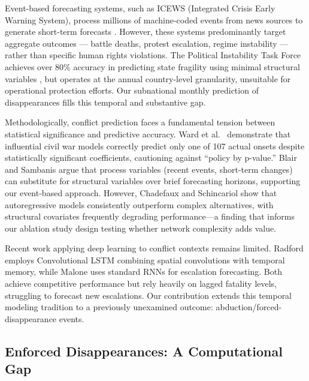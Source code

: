 \documentclass[pdflatex,sn-mathphys-num]{sn-jnl}%
\theoremstyle{thmstyleone}%
\theoremstyle{thmstyletwo}%
\theoremstyle{thmstylethree}%
\begin{document}
Event-based forecasting systems, such as ICEWS (Integrated Crisis Early Warning System), process millions of machine-coded events from news sources to generate short-term forecasts \cite{obrien2010crisis}. However, these systems predominantly target aggregate outcomes — battle deaths, protest escalation, regime instability — rather than specific human rights violations. The Political Instability Task Force achieves over 80\% accuracy in predicting state fragility using minimal structural variables \cite{goldstone2010global}, but operates at the annual country-level granularity, unsuitable for operational protection efforts. Our subnational monthly prediction of disappearances fills this temporal and substantive gap.

Methodologically, conflict prediction faces a fundamental tension between statistical significance and predictive accuracy. Ward et al.~\cite{ward2010perils} demonstrate that influential civil war models correctly predict only one of 107 actual onsets despite statistically significant coefficients, cautioning against ``policy by p-value.'' Blair and Sambanis \cite{blair2020forecasting} argue that process variables (recent events, short-term changes) can substitute for structural variables over brief forecasting horizons, supporting our event-based approach. However, Chadefaux and Schincariol \cite{chadefaux2025endogenous} show that autoregressive models consistently outperform complex alternatives, with structural covariates frequently degrading performance---a finding that informs our ablation study design testing whether network complexity adds value.

Recent work applying deep learning to conflict contexts remains limited. Radford \cite{radford2022high} employs Convolutional LSTM combining spatial convolutions with temporal memory, while Malone \cite{malone2022recurrent} uses standard RNNs for escalation forecasting. Both achieve competitive performance but rely heavily on lagged fatality levels, struggling to forecast new escalations. Our contribution extends this temporal modeling tradition to a previously unexamined outcome: abduction/forced-disappearance events.

\subsection{Enforced Disappearances: A Computational Gap}
\end{document}
